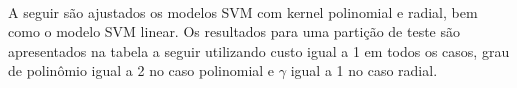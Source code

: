 \documentclass[
  a4paperpaper,
]{article}
\begin{document}
\begin{figure}[H]


\caption{\label{fig-q4}}

\end{figure}%

~

A seguir são ajustados os modelos SVM com kernel polinomial e radial,
bem como o modelo SVM linear. Os resultados para uma partição de teste
são apresentados na tabela a seguir utilizando custo igual a 1 em todos
os casos, grau de polinômio igual a 2 no caso polinomial e \(\gamma\)
igual a 1 no caso radial.
\end{document}
